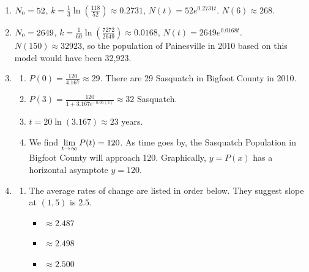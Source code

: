 \documentclass{ximera}
\begin{document}
\begin{enumerate}
\setcounter{enumi}{\value{HW}}


\item  $N_{\text{\tiny $0$}} = 52$,  $k = \frac{1}{3} \ln\left( \frac{118}{52}\right) \approx 0.2731$, $N(t) = 52e^{0.2731t}$.  $N(6) \approx 268$. 

\item  $N_{\text{\tiny $0$}} = 2649$,  $k = \frac{1}{60} \ln\left( \frac{7272}{2649}\right) \approx 0.0168$, $N(t) = 2649e^{0.0168t}$.  $N(150) \approx 32923$, so the population of Painesville in 2010 based on this model would have been 32,923.



\item  \begin{enumerate}  \item  $P(0) = \frac{120}{4.167} \approx 29$.  There are 29 Sasquatch in Bigfoot County in 2010.

\item  $P(3) = \frac{120}{1+3.167e^{-0.05(3)}} \approx 32$ Sasquatch.

\item  $t = 20 \ln(3.167) \approx 23$ years.

\item  We find $\ds{\lim_{t \rightarrow \infty} P(t) =  120}$.  As time goes by, the Sasquatch Population in Bigfoot County will approach 120.  Graphically,  $y = P(x)$ has a horizontal asymptote $y=120$.

\end{enumerate}

\pagebreak

\item 

\begin{enumerate}

\addtocounter{enumii}{1}

\item The average rates of change are listed in order below. They suggest  slope at $(1,5)$ is $2.5$.  

\begin{multicols}{6}

\begin{itemize}

\item $\approx 2.487$

\item $\approx 2.498$

\item $\approx 2.500$


\end{itemize}
\end{multicols}
\end{enumerate}
\end{enumerate}
\end{document}
